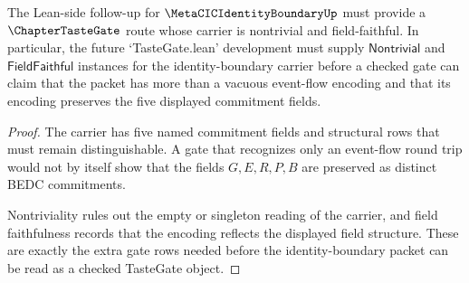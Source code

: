 \begin{theorem}
\label{thm:metacic-identity-boundary-tastegate-followup}
The Lean-side follow-up for $\MetaCICIdentityBoundaryUp$ must provide a $\ChapterTasteGate$ route whose carrier is nontrivial and field-faithful. In particular, the future `TasteGate.lean' development must supply $\mathsf{Nontrivial}$ and $\mathsf{FieldFaithful}$ instances for the identity-boundary carrier before a checked gate can claim that the packet has more than a vacuous event-flow encoding and that its encoding preserves the five displayed commitment fields.
\end{theorem}
\begin{proof}
The carrier has five named commitment fields and structural rows that must remain distinguishable. A gate that recognizes only an event-flow round trip would not by itself show that the fields $G,E,R,P,B$ are preserved as distinct BEDC commitments.

Nontriviality rules out the empty or singleton reading of the carrier, and field faithfulness records that the encoding reflects the displayed field structure. These are exactly the extra gate rows needed before the identity-boundary packet can be read as a checked TasteGate object.
\end{proof}



